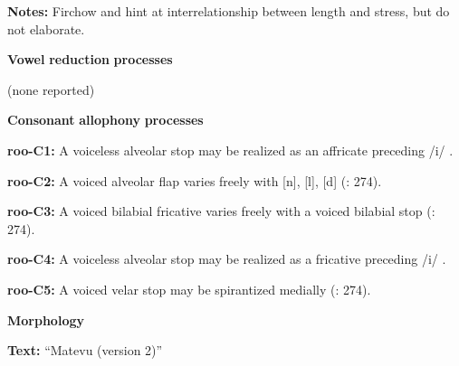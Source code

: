 \documentclass[output=paper]{langsci/langscibook}
\begin{document}
\begin{styleBody}
\textbf{Notes:} Firchow and \citet[271]{Firchow1969} hint at interrelationship between length and stress, but do not elaborate.
\end{styleBody}

\begin{styleBody}
\textbf{Vowel} \textbf{reduction} \textbf{processes}
\end{styleBody}

\begin{styleBody}
(none reported)
\end{styleBody}

\begin{styleBody}
\textbf{Consonant} \textbf{allophony} \textbf{processes}
\end{styleBody}

\begin{styleBody}
\textbf{roo-C1:} A voiceless alveolar stop may be realized as an affricate preceding /i/ \citep[28]{Robinson2011}.
\end{styleBody}

\begin{styleBody}
\textbf{roo-C2:} A voiced alveolar flap varies freely with [n], [l], [d] (\citealt{FirchowFirchow1969}: 274).
\end{styleBody}

\begin{styleBody}
\textbf{roo-C3:} A voiced bilabial fricative varies freely with a voiced bilabial stop (\citealt{FirchowFirchow1969}: 274).
\end{styleBody}

\begin{styleBody}
\textbf{roo-C4:} A voiceless alveolar stop may be realized as a fricative preceding /i/ \citep[28]{Robinson2011}.
\end{styleBody}

\begin{styleBody}
\textbf{roo-C5:} A voiced velar stop may be spirantized medially (\citealt{FirchowFirchow1969}: 274).
\end{styleBody}

\begin{styleBody}
\textbf{Morphology}
\end{styleBody}

\begin{styleBody}
\textbf{Text:} “Matevu (version 2)” \citep[293-304]{Robinson2011}
\end{styleBody}
\end{document}
